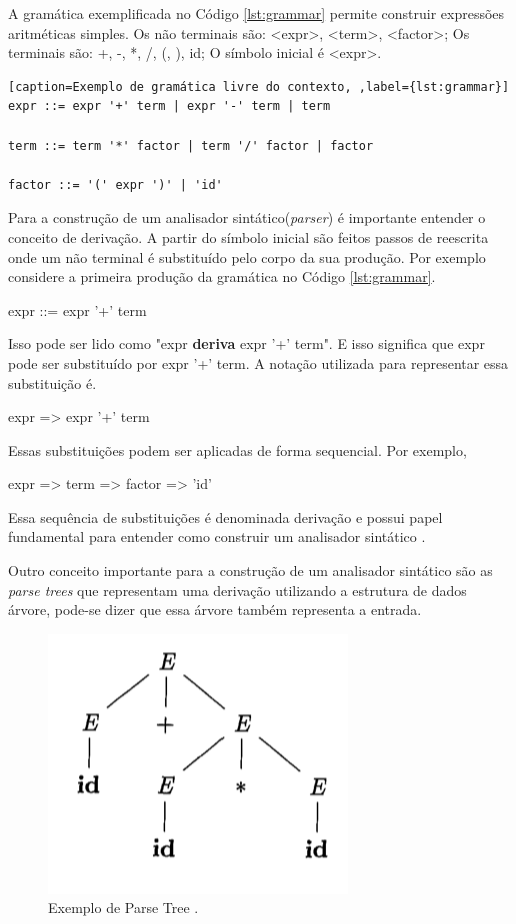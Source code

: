 A gramática exemplificada no Código \ref{lst:grammar} permite construir expressões aritméticas simples. 
Os não terminais são: <expr>, <term>, <factor>; Os terminais são: +, -, *, /, (, ), id; O símbolo inicial é <expr>.

\begin{lstlisting}[caption=Exemplo de gramática livre do contexto, ,label={lst:grammar}]
expr ::= expr '+' term | expr '-' term | term

term ::= term '*' factor | term '/' factor | factor

factor ::= '(' expr ')' | 'id'
\end{lstlisting}

Para a construção de um analisador sintático(\textit{parser}) é importante entender o conceito de derivação. 
A partir do símbolo inicial são feitos passos de reescrita onde um não terminal é substituído pelo
corpo da sua produção. Por exemplo considere a primeira produção da gramática no Código \ref{lst:grammar}. 

\begin{center}
expr ::= expr '+' term
\end{center}

Isso pode ser lido como "expr \textbf{deriva} expr '+' term". E isso significa que expr pode
ser substituído por expr '+' term. A notação utilizada para representar essa substituição é.

\begin{center}
expr => expr '+' term
\end{center}

Essas substituições podem ser aplicadas de forma sequencial. Por exemplo,

\begin{center}
    expr => term => factor => 'id'
\end{center}

Essa sequência de substituições é denominada derivação e possui papel fundamental para entender
como construir um analisador sintático \cite{aho2006}. 

Outro conceito importante para a construção de um analisador sintático são
as \textit{parse trees} que representam uma derivação utilizando a estrutura de dados árvore, 
pode-se dizer que essa árvore também representa a entrada.

\begin{figure}[h]
	\centering
	\includegraphics[keepaspectratio=true,scale=1]{figuras/parsetree.png}
	\caption{Exemplo de Parse Tree \cite{aho2006}.}
	\label{fig:parsetree}
\end{figure}

